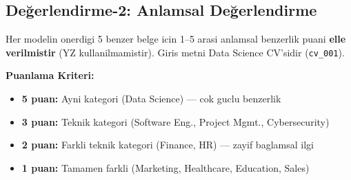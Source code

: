\documentclass[12pt, a4paper]{article}
\begin{document}
\subsection{Değerlendirme-2: Anlamsal Değerlendirme}

Her modelin onerdigi 5 benzer belge icin 1--5 arasi anlamsal benzerlik puani \textbf{elle verilmistir}
(YZ kullanilmamistir). Giris metni Data Science CV'sidir (\texttt{cv\_001}).

\textbf{Puanlama Kriteri:}
\begin{itemize}
    \item \textbf{5 puan:} Ayni kategori (Data Science) --- cok guclu benzerlik
    \item \textbf{3 puan:} Teknik kategori (Software Eng., Project Mgmt., Cybersecurity)
    \item \textbf{2 puan:} Farkli teknik kategori (Finance, HR) --- zayif baglamsal ilgi
    \item \textbf{1 puan:} Tamamen farkli (Marketing, Healthcare, Education, Sales)
\end{itemize}
\end{document}
